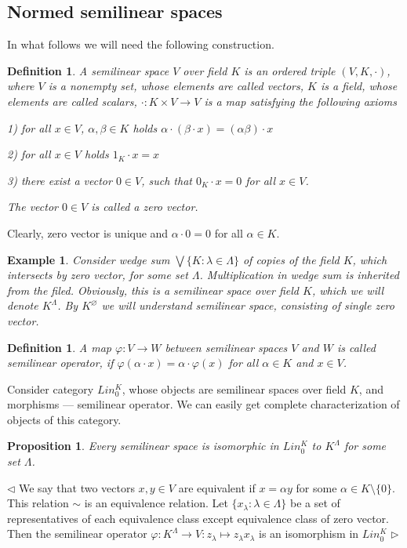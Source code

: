 \documentclass[12pt]{article}
\newtheorem{proposition}[theorem]{Proposition}
\newtheorem{definition}[theorem]{Definition}
\newtheorem{example}[theorem]{Example}
\newenvironment{proof}{\par $\triangleleft$}{$\triangleright$}
\begin{document}
\subsection{Normed semilinear spaces}

In what follows we will need the following construction.

\begin{definition}\label{DefSemiLinSp} A semilinear space $V$ over field $K$ is an ordered triple $(V, K, \cdot)$, where $V$ is a nonempty set, whose elements are called vectors, $K$ is a field, whose elements are called scalars, $\cdot : K \times V \to V$ is a map satisfying the following axioms

1) for all $x\in V$, $\alpha,\beta\in K$ holds $\alpha \cdot (\beta \cdot x) = (\alpha \beta) \cdot x $

2) for all $x\in V$ holds $1_K \cdot x = x$

3) there exist a vector $0 \in V$, such that $0_K \cdot x = 0$ for all $x\in V$.

The vector $0\in V$ is called a zero vector.
\end{definition}

Clearly, zero vector is unique and $\alpha \cdot 0 = 0$ for all $\alpha\in K$.

\begin{example}\label{ExSemiLinModelSp}
Consider wedge sum $\bigvee\{K: \lambda \in\Lambda\}$ of copies of the field $K$, which intersects by zero vector, for some set $\Lambda$. Multiplication in wedge sum is inherited from the filed. Obviously, this is a semilinear space over field $K$, which we will denote $K^{\Lambda}$. By $K^{\varnothing}$ we will understand semilinear space, consisting of single zero vector. 
\end{example}

\begin{definition}\label{DefSemiLinOp} A map $\varphi : V \to W$ between semilinear spaces $V$ and $W$ is called semilinear operator, if $\varphi(\alpha \cdot x) = \alpha \cdot \varphi(x)$ for all $\alpha \in K$ and $x \in V$.
\end{definition}

Consider category $Lin_{0}^{K}$, whose objects are semilinear spaces over field $K$, and morphisms --- semilinear operator. We can easily get complete characterization of objects of this category.

\begin{proposition}\label{PrSemiLinSpDesc}
Every semilinear space is isomorphic in $Lin_{0}^{K}$ to $K^{\Lambda}$ for some set $\Lambda$.
\end{proposition}
\begin{proof} We say that two vectors $x,y\in V$ are equivalent if $x=\alpha y$ for some $\alpha\in K\setminus\{0\}$. This relation $\sim$ is an equivalence relation. Let $\{x_\lambda:\lambda\in \Lambda\}$  be a set of representatives of each equivalence class except equivalence class of zero vector. Then the semilinear operator $\varphi: K^\Lambda\to V: z_\lambda\mapsto z_\lambda x_\lambda$ is an isomorphism in  $Lin_0^K$
\end{proof}
\end{document}
